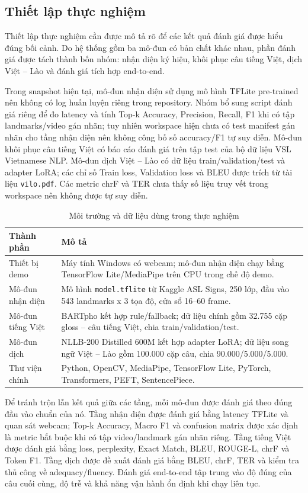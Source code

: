 ﻿\subsection{Thiết lập thực nghiệm}

Thiết lập thực nghiệm cần được mô tả rõ để các kết quả đánh giá được hiểu đúng bối cảnh. Do hệ thống gồm ba mô-đun có bản chất khác nhau, phần đánh giá được tách thành bốn nhóm: nhận diện ký hiệu, khôi phục câu tiếng Việt, dịch Việt -- Lào và đánh giá tích hợp end-to-end.

Trong snapshot hiện tại, mô-đun nhận diện sử dụng mô hình TFLite pre-trained nên không có log huấn luyện riêng trong repository. Nhóm bổ sung script đánh giá riêng để đo latency và tính Top-k Accuracy, Precision, Recall, F1 khi có tập landmarks/video gán nhãn; tuy nhiên workspace hiện chưa có test manifest gán nhãn cho tầng nhận diện nên không công bố số accuracy/F1 tự suy diễn. Mô-đun khôi phục câu tiếng Việt có báo cáo đánh giá trên tập test của bộ dữ liệu VSL Vietnamese NLP. Mô-đun dịch Việt -- Lào có dữ liệu train/validation/test và adapter LoRA; các chỉ số Train loss, Validation loss và BLEU được trích từ tài liệu \texttt{vilo.pdf}. Các metric chrF và TER chưa thấy số liệu truy vết trong workspace nên không được tự suy diễn.

\begin{table}[H]
\centering
\caption{Môi trường và dữ liệu dùng trong thực nghiệm}
\label{tab:experiment-setup}
\begin{tabularx}{\textwidth}{|l|X|}
\hline
\textbf{Thành phần} & \textbf{Mô tả} \\
\hline
Thiết bị demo & Máy tính Windows có webcam; mô-đun nhận diện chạy bằng TensorFlow Lite/MediaPipe trên CPU trong chế độ demo. \\
\hline
Mô-đun nhận diện & Mô hình \texttt{model.tflite} từ Kaggle ASL Signs, 250 lớp, đầu vào 543 landmarks x 3 tọa độ, cửa sổ 16--60 frame. \\
\hline
Mô-đun tiếng Việt & BARTpho kết hợp rule/fallback; dữ liệu chính gồm 32.755 cặp gloss -- câu tiếng Việt, chia train/validation/test. \\
\hline
Mô-đun dịch & NLLB-200 Distilled 600M kết hợp adapter LoRA; dữ liệu song ngữ Việt -- Lào gồm 100.000 cặp câu, chia 90.000/5.000/5.000. \\
\hline
Thư viện chính & Python, OpenCV, MediaPipe, TensorFlow Lite, PyTorch, Transformers, PEFT, SentencePiece. \\
\hline
\end{tabularx}
\end{table}

Để tránh trộn lẫn kết quả giữa các tầng, mỗi mô-đun được đánh giá theo đúng đầu vào chuẩn của nó. Tầng nhận diện được đánh giá bằng latency TFLite và quan sát webcam; Top-k Accuracy, Macro F1 và confusion matrix được xác định là metric bắt buộc khi có tập video/landmark gán nhãn riêng. Tầng tiếng Việt được đánh giá bằng loss, perplexity, Exact Match, BLEU, ROUGE-L, chrF và Token F1. Tầng dịch được đề xuất đánh giá bằng BLEU, chrF, TER và kiểm tra thủ công về adequacy/fluency. Đánh giá end-to-end tập trung vào độ đúng của câu cuối cùng, độ trễ và khả năng vận hành ổn định khi chạy liên tục.

